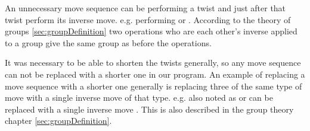 An unnecessary move sequence can be performing a twist and just after that twist perform its inverse move. e.g. performing  or .
According to the theory of groups \ref{sec:groupDefinition} two operations who are each other's inverse applied to a group give the same group as before the operations.

It was necessary to be able to shorten the twists generally, so any move sequence can not be replaced with a shorter one in our program.
An example of replacing a move sequence with a shorter one generally is replacing three of the same type of move with a single inverse move of that type. e.g.  also noted as  or  can be replaced with a single inverse move . This is also described in the group theory chapter \ref{sec:groupDefinition}.

